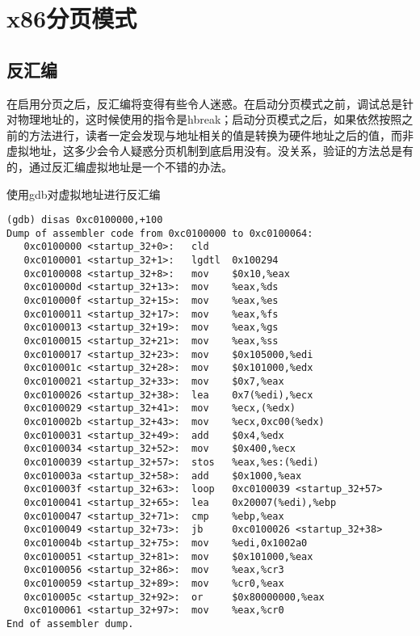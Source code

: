 \section{x86分页模式}

\subsection{反汇编}
在启用分页之后，反汇编将变得有些令人迷惑。在启动分页模式之前，调试总是针对物理地址的，这时候使用的指令是hbreak；启动分页模式之后，如果依然按照之前的方法进行，读者一定会发现与地址相关的值是转换为硬件地址之后的值，而非虚拟地址，这多少会令人疑惑分页机制到底启用没有。没关系，验证的方法总是有的，通过反汇编虚拟地址是一个不错的办法。

使用gdb对虚拟地址进行反汇编
\begin{lstlisting}
(gdb) disas 0xc0100000,+100
Dump of assembler code from 0xc0100000 to 0xc0100064:
   0xc0100000 <startup_32+0>:   cld
   0xc0100001 <startup_32+1>:   lgdtl  0x100294
   0xc0100008 <startup_32+8>:   mov    $0x10,%eax
   0xc010000d <startup_32+13>:  mov    %eax,%ds
   0xc010000f <startup_32+15>:  mov    %eax,%es
   0xc0100011 <startup_32+17>:  mov    %eax,%fs
   0xc0100013 <startup_32+19>:  mov    %eax,%gs
   0xc0100015 <startup_32+21>:  mov    %eax,%ss
   0xc0100017 <startup_32+23>:  mov    $0x105000,%edi
   0xc010001c <startup_32+28>:  mov    $0x101000,%edx
   0xc0100021 <startup_32+33>:  mov    $0x7,%eax
   0xc0100026 <startup_32+38>:  lea    0x7(%edi),%ecx
   0xc0100029 <startup_32+41>:  mov    %ecx,(%edx)
   0xc010002b <startup_32+43>:  mov    %ecx,0xc00(%edx)
   0xc0100031 <startup_32+49>:  add    $0x4,%edx
   0xc0100034 <startup_32+52>:  mov    $0x400,%ecx
   0xc0100039 <startup_32+57>:  stos   %eax,%es:(%edi)
   0xc010003a <startup_32+58>:  add    $0x1000,%eax
   0xc010003f <startup_32+63>:  loop   0xc0100039 <startup_32+57>
   0xc0100041 <startup_32+65>:  lea    0x20007(%edi),%ebp
   0xc0100047 <startup_32+71>:  cmp    %ebp,%eax
   0xc0100049 <startup_32+73>:  jb     0xc0100026 <startup_32+38>
   0xc010004b <startup_32+75>:  mov    %edi,0x1002a0
   0xc0100051 <startup_32+81>:  mov    $0x101000,%eax
   0xc0100056 <startup_32+86>:  mov    %eax,%cr3
   0xc0100059 <startup_32+89>:  mov    %cr0,%eax
   0xc010005c <startup_32+92>:  or     $0x80000000,%eax
   0xc0100061 <startup_32+97>:  mov    %eax,%cr0
End of assembler dump.
\end{lstlisting}


